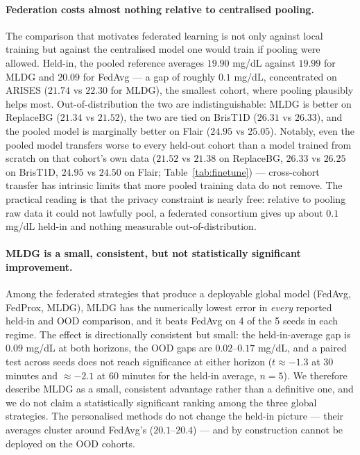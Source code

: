 \documentclass[10pt,letterpaper]{article}
\begin{document}
\paragraph{Federation costs almost nothing relative to centralised pooling.} The
comparison that motivates federated learning is not only against local training
but against the centralised model one would train if pooling were allowed.
Held-in, the pooled reference averages $19.90$ mg/dL against $19.99$ for MLDG
and $20.09$ for FedAvg --- a gap of roughly $0.1$ mg/dL, concentrated on ARISES
($21.74$ vs $22.30$ for MLDG), the smallest cohort, where pooling plausibly
helps most. Out-of-distribution the two are indistinguishable: MLDG is better on
ReplaceBG ($21.34$ vs $21.52$), the two are tied on BrisT1D ($26.31$ vs
$26.33$), and the pooled model is marginally better on Flair ($24.95$ vs
$25.05$). Notably, even the pooled model transfers worse to every held-out
cohort than a model trained from scratch on that cohort's own data
($21.52$ vs $21.38$ on ReplaceBG, $26.33$ vs $26.25$ on BrisT1D, $24.95$ vs
$24.50$ on Flair; Table~\ref{tab:finetune}) --- cross-cohort transfer has
intrinsic limits that more pooled training data do not remove. The practical
reading is that the privacy constraint is nearly free: relative to pooling raw
data it could not lawfully pool, a federated consortium gives up about
$0.1$ mg/dL held-in and nothing measurable out-of-distribution.

\paragraph{MLDG is a small, consistent, but not statistically significant
improvement.} Among the federated strategies that produce a deployable global
model (FedAvg, FedProx, MLDG), MLDG
has the numerically lowest error in \emph{every} reported held-in and OOD
comparison, and
it beats FedAvg on 4 of the 5 seeds in each regime. The effect is directionally
consistent but small: the held-in-average gap is $0.09$ mg/dL at both horizons,
the OOD gaps are $0.02$--$0.17$ mg/dL, and a paired test across seeds does not
reach significance at either horizon ($t \approx -1.3$ at 30 minutes and
$\approx -2.1$ at 60 minutes for the held-in average, $n=5$). We therefore
describe MLDG as a small, consistent advantage rather than a definitive one, and
we do not claim a statistically significant ranking among the three global
strategies. The personalised methods do not change the
held-in picture --- their averages cluster around FedAvg's ($20.1$--$20.4$) ---
and by construction cannot be deployed on the OOD cohorts.
\end{document}
